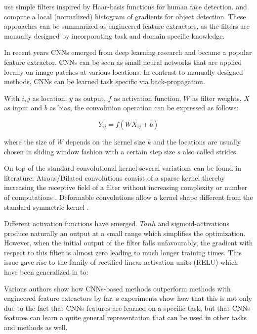	\cite{Viola2004} use simple filters inspired by Haar-basis functions for human face detection. \cite{Dalal} and \cite{Lowe2004} compute a local (normalized) histogram of gradients for object detection. These approaches can be summarized as engineered feature extractors, as the filters are manually designed by incorporating task and domain specific knowledge. 
	
	In recent years \acp{CNN} emerged from deep learning research and became a popular feature extractor. \acp{CNN} can be seen as small neural networks that are applied locally on image patches at various locations. In contrast to manually designed methods, \acp{CNN} can be learned task specific via back-propagation.
	
	With $i,j$ as location, $y$ as output, $f$ as activation function, $W$ as filter weights, $X$ as input and $b$ as bias, the convolution operation can be expressed as follows:
	
	$$Y_{ij} = f(WX_{ij} + b)$$
	
	where the size of $W$ depends on the kernel size $k$ and the locations are usually chosen in sliding window fashion with a certain step size $s$ also called strides.
	
	On top of the standard convolutional kernel several variations can be found in literature: Atrous/Dilated convolutions consist of a sparse kernel thereby increasing the receptive field of a filter without increasing complexity or number of computations . Deformable convolutions allow a kernel shape different from the standard symmetric kernel .
	
	Different activation functions have emerged. $Tanh$ and sigmoid-activations produce naturally an output at a small range which simplifies the optimization. However, when the initial output of the filter falls unfavourably, the gradient with respect to this filter is almost zero leading to much longer training times. This issue gave rise to the family of rectified linear activation units (RELU) which have been generalized in  to:
	$$$$
	
	
	Various authors show how \acp{CNN}-based methods outperform methods with engineered feature extractors by far. \cite{Razavian}s experiments show how that this is not only due to the fact that \acp{CNN}-features are learned on a specific task, but that \acp{CNN}-features can learn a quite general representation that can be used in other tasks and methods as well.
	
